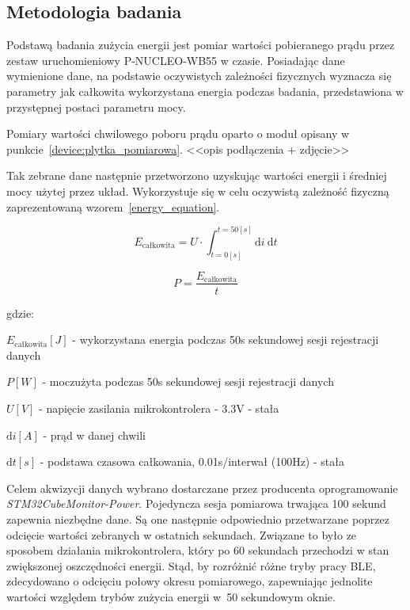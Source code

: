 \subsection{Metodologia badania}

Podstawą badania zużycia energii jest pomiar wartości pobieranego prądu przez zestaw uruchomieniowy
P-NUCLEO-WB55 w czasie. Posiadając dane wymienione dane, na podstawie oczywistych
zależności fizycznych wyznacza się parametry jak całkowita wykorzystana energia
podczas badania, przedstawiona w przystępnej postaci parametru mocy.

Pomiary wartości chwilowego poboru prądu oparto o moduł opisany w punkcie~\ref{device:plytka_pomiarowa}.
<<opis podłączenia + zdjęcie>>
\lipsum[1-1]

Tak zebrane dane następnie przetworzono uzyskując wartości energii i średniej mocy
użytej przez układ. Wykorzystuje się w celu oczywistą zależność fizyczną zaprezentowaną
wzorem~\ref{energy_equation}\cite{skoro_marta_fizyka_1973}.

\begin{equation} \label{energy_equation}
E_{\text{całkowita}} = U \cdot \int_{t=0[s]}^{t=50[s]} \mathrm{d}i \: \mathrm{d} t
\end{equation}

\begin{equation} \label{power_equation}
P = \frac{E_{\text{całkowita}}}{t}
\end{equation}

gdzie:

\begin{description}
\item $E_{\text{całkowita}} [J]$ - wykorzystana energia podczas 50s sekundowej sesji rejestracji danych
\item $P [W]$ - moczużyta podczas 50s sekundowej sesji rejestracji danych
\item $U [V]$ - napięcie zasilania mikrokontrolera - 3.3V - stała
\item $\mathrm{d}i [A]$ - prąd w danej chwili
\item $\mathrm{d}t [s]$ - podstawa czasowa całkowania, 0.01s/interwał (100Hz) - stała 
\end{description}

Celem akwizycji danych wybrano dostarczane przez producenta oprogramowanie \textit{STM32CubeMonitor-Power}.
Pojedyncza sesja pomiarowa trwająca 100 sekund zapewnia niezbędne dane. Są one następnie
odpowiednio przetwarzane poprzez odcięcie wartości zebranych w ostatnich sekundach. Związane to było
ze sposobem działania mikrokontrolera, który po 60 sekundach przechodzi w stan zwiększonej
oszczędności energii. Stąd, by rozróżnić różne tryby pracy \gls{BLE}, zdecydowano o odcięciu
połowy okresu pomiarowego, zapewniając jednolite wartości względem trybów zużycia energii
w~50 sekundowym oknie.

